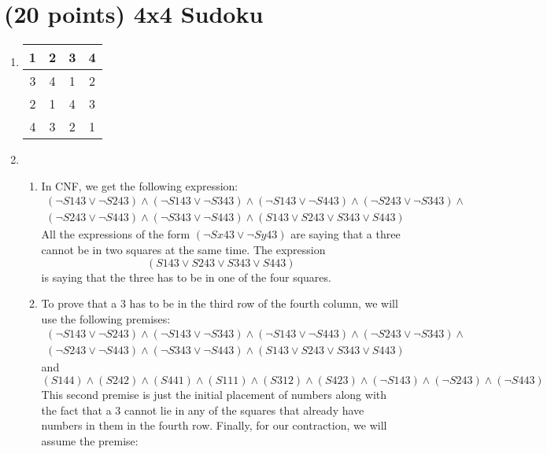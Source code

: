 \documentclass{article}
\begin{document}
	\section{(20 points) 4x4 Sudoku}
	\begin{enumerate}
		\item \begin{tabular}{|c|c|c|c|}
			\hline
			1 & 2 & 3 & 4 \\\hline
			3 & 4 & 1 & 2 \\\hline
			2 & 1 & 4 & 3 \\\hline
			4 & 3 & 2 & 1 \\\hline
		\end{tabular}
		\item 
		\leavevmode
		\begin{enumerate}
			\item In CNF, we get the following expression:
			\begin{multline*}
			(\neg S143 \lor \neg S243)\land (\neg S143 \lor \neg S343)\land (\neg S143 \lor \neg S443)\land (\neg S243 \lor \neg S343)\land \\ (\neg S243 \lor \neg S443)\land (\neg S343 \lor \neg S443)\land (S143 \lor S243 \lor S343 \lor S443) 
			\end{multline*}
			All the expressions of the form $(\neg Sx43 \lor \neg Sy43)$ are saying that a three cannot be in two squares at the same time. The expression
			\[ (S143 \lor S243 \lor S343 \lor S443) \]
			is saying that the three has to be in one of the four squares. 
			\item To prove that a 3 has to be in the third row of the fourth column, we will use the following premises:
			\begin{multline*}
			(\neg S143 \lor \neg S243)\land (\neg S143 \lor \neg S343)\land (\neg S143 \lor \neg S443)\land (\neg S243 \lor \neg S343)\land \\ (\neg S243 \lor \neg S443)\land (\neg S343 \lor \neg S443)\land (S143 \lor S243 \lor S343 \lor S443) 
			\end{multline*}
			and
			\begin{equation*}
			(S144)\land(S242)\land(S441)\land(S111)\land(S312)\land(S423)\land(\neg S143)\land(\neg S243)\land(\neg S443)
			\end{equation*}
			This second premise is just the initial placement of numbers along with the fact that a 3 cannot lie in any of the squares that already have numbers in them in the fourth row. Finally, for our contraction, we will assume the premise:
			\begin{equation*}

\end{equation*}
\end{enumerate}
\end{enumerate}
\end{document}
